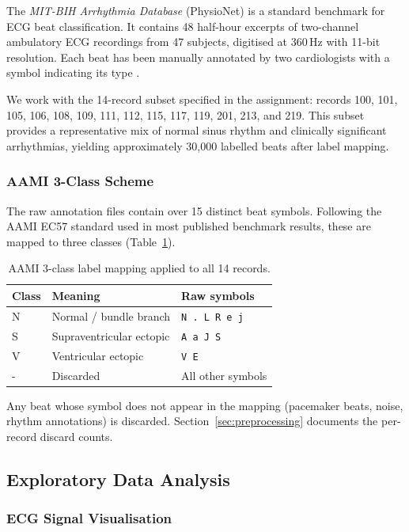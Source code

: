 \documentclass[twocolumn, fontsize=10pt]{article}
\begin{document}
The \textit{MIT-BIH Arrhythmia Database} (PhysioNet) is a standard benchmark for ECG beat classification. It contains 48 half-hour excerpts of two-channel ambulatory ECG recordings from 47 subjects, digitised at 360\,Hz with 11-bit resolution. Each beat has been manually annotated by two cardiologists with a symbol indicating its type \citep{moody2001impact}.

We work with the 14-record subset specified in the assignment: records 100, 101, 105, 106, 108, 109, 111, 112, 115, 117, 119, 201, 213, and 219. This subset provides a representative mix of normal sinus rhythm and clinically significant arrhythmias, yielding approximately 30,000 labelled beats after label mapping.

\subsubsection{AAMI 3-Class Scheme}

The raw annotation files contain over 15 distinct beat symbols. Following the AAMI EC57 standard used in most published benchmark results, these are mapped to three classes (Table~\ref{tab:label_map}).

\begin{table}[H]
\centering
\small
\setlength{\tabcolsep}{3pt}
\begin{tabular}{llp{2.8cm}}
\toprule
\textbf{Class} & \textbf{Meaning} & \textbf{Raw symbols} \\
\midrule
N & Normal / bundle branch & \texttt{N . L R e j} \\
S & Supraventricular ectopic & \texttt{A a J S} \\
V & Ventricular ectopic & \texttt{V E} \\
- & Discarded & All other symbols \\
\bottomrule
\end{tabular}
\caption{AAMI 3-class label mapping applied to all 14 records.}
\label{tab:label_map}
\end{table}

Any beat whose symbol does not appear in the mapping (pacemaker beats, noise, rhythm annotations) is discarded. Section~\ref{sec:preprocessing} documents the per-record discard counts.

\subsection{Exploratory Data Analysis}

\subsubsection{ECG Signal Visualisation}
\end{document}
